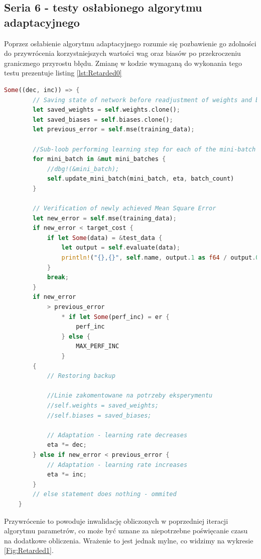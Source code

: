 \documentclass[12pt,twoside]{article}
\begin{document}
\subsection{Seria 6 - testy osłabionego algorytmu adaptacyjnego}
Poprzez osłabienie algorytmu adaptacyjnego rozumie się pozbawienie go zdolności do przywrócenia korzystniejszych wartości wag oraz biasów po przekroczeniu granicznego przyrostu błędu.
Zmianę w kodzie wymaganą do wykonania tego testu prezentuje listing \ref{lst:Retarded0}
\begin{lstlisting}[language=Rust,caption=Fragment funkcji sgd\(...\) - zakomentowanie linii przywracających zachowane wagi oraz biasy,label={lst:Retarded0}]
	Some((dec, inc)) => {
		// Saving state of network before readjustment of weights and biases
		let saved_weights = self.weights.clone();
		let saved_biases = self.biases.clone();
		let previous_error = self.mse(training_data);

		//Sub-loob performing learning step for each of the mini-batch
		for mini_batch in &mut mini_batches {
			//dbg!(&mini_batch);
			self.update_mini_batch(mini_batch, eta, batch_count)
		}

		// Verification of newly achieved Mean Square Error
		let new_error = self.mse(training_data);
		if new_error < target_cost {
			if let Some(data) = &test_data {
				let output = self.evaluate(data);
				println!("{},{}", self.name, output.1 as f64 / output.0 as f64);
			}
			break;
		}
		if new_error
			> previous_error
				* if let Some(perf_inc) = er {
					perf_inc
				} else {
					MAX_PERF_INC
				}
		{
			// Restoring backup

			//Linie zakomentowane na potrzeby eksperymentu
			//self.weights = saved_weights;
			//self.biases = saved_biases;

			// Adaptation - learning rate decreases
			eta *= dec;
		} else if new_error < previous_error {
			// Adaptation - learning rate increases
			eta *= inc;
		}
		// else statement does nothing - ommited
	}
\end{lstlisting}
Przywrócenie to powoduje inwalidację obliczonych w poprzedniej iteracji algorytmu parametrów, co może być uznane za niepotrzebne poświęcanie czasu na dodatkowe obliczenia.
Wrażenie to jest jednak mylne, co widzimy na wykresie \ref{Fig:Retarded1}.
\end{document}
